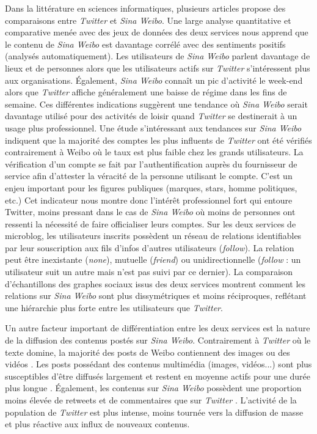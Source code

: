 Dans la littérature en sciences informatiques, plusieurs articles propose des comparaisons entre \textit{Twitter} et \textit{Sina Weibo}. Une large analyse quantitative et comparative menée avec des jeux de données des deux services \citep{Gao2012} nous apprend que le contenu de \textit{Sina Weibo} est davantage corrélé avec des sentiments positifs (analysés automatiquement). Les utilisateurs de \textit{Sina Weibo} parlent davantage de lieux et de personnes alors que les utilisateurs actifs sur \textit{Twitter} s’intéressent plus aux organisations. Également, \textit{Sina Weibo} connaît un pic d’activité le week-end alors que \textit{Twitter} affiche généralement une baisse de régime dans les fins de semaine. Ces différentes indications suggèrent une tendance où \textit{Sina Weibo} serait davantage utilisé pour des activités de loisir quand \textit{Twitter} se destinerait à un usage plus professionnel. Une étude s’intéressant aux tendances sur \textit{Sina Weibo} \citep{Yu2011} indiquent que la majorité des comptes les plus influents de \textit{Twitter} ont été vérifiés contrairement à Weibo où le taux est plus faible chez les grands utilisateurs. La vérification d’un compte se fait par l’authentification auprès du fournisseur de service afin d’attester la véracité de la personne utilisant le compte. C’est un enjeu important pour les figures publiques (marques, stars, homme politiques, etc.) Cet indicateur nous montre donc l’intérêt professionnel fort qui entoure Twitter, moins pressant dans le cas de \textit{Sina Weibo} où moins de personnes ont ressenti la nécessité de faire officialiser leurs comptes. Sur les deux services de microblog, les utilisateurs inscrits possèdent un réseau de relations identifiables par leur souscription aux fils d’infos d’autres utilisateurs (\textit{follow}). La relation peut être inexistante (\textit{none}), mutuelle (\textit{friend}) ou unidirectionnelle (\textit{follow} : un utilisateur suit un autre mais n’est pas suivi par ce dernier). La comparaison d’échantillons des graphes sociaux issus des deux services \citep{Chen2012} montrent comment les relations sur \textit{Sina Weibo} sont plus dissymétriques et moins réciproques, reflétant une hiérarchie plus forte entre les utilisateurs que \textit{Twitter}. 

Un autre facteur important de différentiation entre les deux services est la nature de la diffusion des contenus postés sur \textit{Sina Weibo}. Contrairement à \textit{Twitter} où le texte domine, la majorité des posts de Weibo contiennent des images ou des vidéos \citep{Zhao2012}. Les posts possédant des contenus multimédia (images, vidéos...) sont plus susceptibles d’être diffusés largement et restent en moyenne actifs pour une durée plus longue \citep{Zhao2012}. Également, les contenus sur \textit{Sina Weibo} possèdent une proportion moins élevée de retweets et de commentaires que sur \textit{Twitter} \citep{Zhao2012, Gao2012}. L’activité de la population de \textit{Twitter} est plus intense, moins tournée vers la diffusion de masse et plus réactive aux influx de nouveaux contenus. 

